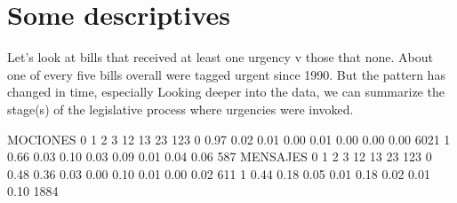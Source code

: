 \documentclass[letter,12pt]{article}
\begin{document}
\section{Some descriptives}

Let's look at bills that received at least one urgency v those that none. About one of every five bills overall were tagged urgent since 1990. But the pattern has changed in time, especially 
Looking deeper into the data, we can summarize the stage(s) of the legislative process where urgencies were invoked. 

MOCIONES
     0    1    2    3   12   13   23  123     
0 0.97 0.02 0.01 0.00 0.01 0.00 0.00 0.00 6021
1 0.66 0.03 0.10 0.03 0.09 0.01 0.04 0.06  587
MENSAJES
     0    1    2    3   12   13   23  123     
0 0.48 0.36 0.03 0.00 0.10 0.01 0.00 0.02  611
1 0.44 0.18 0.05 0.01 0.18 0.02 0.01 0.10 1884

 



\end{document}
